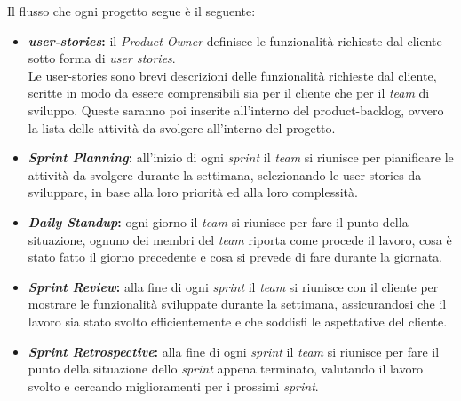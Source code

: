 Il flusso che ogni progetto segue è il seguente:
\begin{itemize}
    \item \textbf{\textit{\gls{user-stories}}:} il \textit{Product Owner} definisce le funzionalità richieste dal cliente sotto forma di \textit{user stories}.\\
    Le \gls{user-stories} sono brevi descrizioni delle funzionalità richieste dal cliente, scritte in modo da essere comprensibili sia per il cliente che per il \textit{team} di sviluppo.
    Queste saranno poi inserite all'interno del \gls{product-backlog}, ovvero la lista delle attività da svolgere all'interno del progetto.
    \item \textbf{\textit{Sprint Planning}:} all'inizio di ogni \textit{sprint} il \textit{team} si riunisce per pianificare le attività da svolgere durante la settimana, selezionando le \gls{user-stories} da sviluppare, 
    in base alla loro priorità ed alla loro complessità.
    \item \textbf{\textit{Daily Standup}:} ogni giorno il \textit{team} si riunisce per fare il punto della situazione, ognuno dei membri del \textit{team} riporta come procede il lavoro,
    cosa è stato fatto il giorno precedente e cosa si prevede di fare durante la giornata.
    \item \textbf{\textit{Sprint Review}:} alla fine di ogni \textit{sprint} il \textit{team} si riunisce con il cliente per mostrare le funzionalità sviluppate durante la settimana, assicurandosi che il lavoro sia stato svolto efficientemente e 
    che soddisfi le aspettative del cliente.
    \item \textbf{\textit{Sprint Retrospective}:} alla fine di ogni \textit{sprint} il \textit{team} si riunisce per fare il punto della situazione dello \textit{sprint} appena terminato, 
    valutando il lavoro svolto e cercando miglioramenti per i prossimi \textit{sprint}.
\end{itemize}
